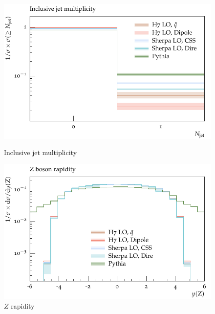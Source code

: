 \begin{figure}[h]
  \centering
  \begin{minipage}[t]{0.49\textwidth}
    \includegraphics[width=1\textwidth]{plots/Z-91-MuShower/LH_Z/jet_multi_inclusive.pdf}
    \caption{Inclusive jet multiplicity}
    \label{fig:z:jet_multi_inc}
  \end{minipage}
  \begin{minipage}[t]{0.49\textwidth}
    \includegraphics[width=1\textwidth]{plots/Z-91-MuShower/LH_Z/X_y.pdf}
    \caption{$Z$ rapidity}
    \label{fig:z:y}
  \end{minipage}
\end{figure}
